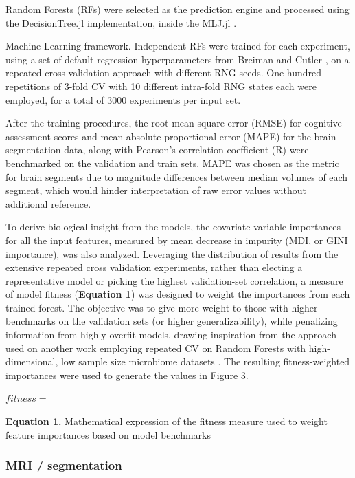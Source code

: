 \documentclass{article}
\begin{document}
Random Forests (RFs)
\cite{breimanRandomForests2001}
were selected as the prediction engine and processed using the
DecisionTree.jl \cite{sadeghiDecisionTreeJlJulia2022}
implementation, inside the MLJ.jl \cite{blaomMLJJuliaPackage2020}.

Machine Learning framework. Independent RFs were trained for each
experiment, using a set of default regression hyperparameters from
Breiman and Cutler \cite{breimanRandomForests2001},
on a repeated cross-validation approach with different RNG seeds. One hundred
repetitions of 3-fold CV with 10 different intra-fold RNG states each
were employed, for a total of 3000 experiments per input set.

After the training procedures, the root-mean-square error (RMSE) for
cognitive assessment scores and mean absolute proportional error (MAPE)
for the brain segmentation data, along with Pearson's
correlation coefficient (R) were benchmarked on the validation and train
sets. MAPE was chosen as the metric for brain segments due to magnitude
differences between median volumes of each segment, which would hinder
interpretation of raw error values without additional reference.

To derive biological insight from the models, the covariate variable
importances for all the input features, measured by mean decrease in
impurity (MDI, or GINI importance), was also analyzed. Leveraging the
distribution of results from the extensive repeated cross validation
experiments, rather than electing a representative model or picking the
highest validation-set correlation, a measure of model fitness
(\textbf{Equation 1}) was designed to weight the importances from each
trained forest. The objective was to give more weight to those with
higher benchmarks on the validation sets (or higher generalizability),
while penalizing information from highly overfit models, drawing
inspiration from the approach used on another work employing repeated CV
on Random Forests with high-dimensional, low sample size microbiome
datasets \cite{woodruffInflammationAutoreactivityDefine2022}.
The resulting fitness-weighted importances were used
to generate the values in Figure 3.

\(fitness =\)

\textbf{Equation 1.} Mathematical expression of the fitness measure used
to weight feature importances based on model benchmarks

\subsubsection*{MRI / segmentation}
\end{document}
